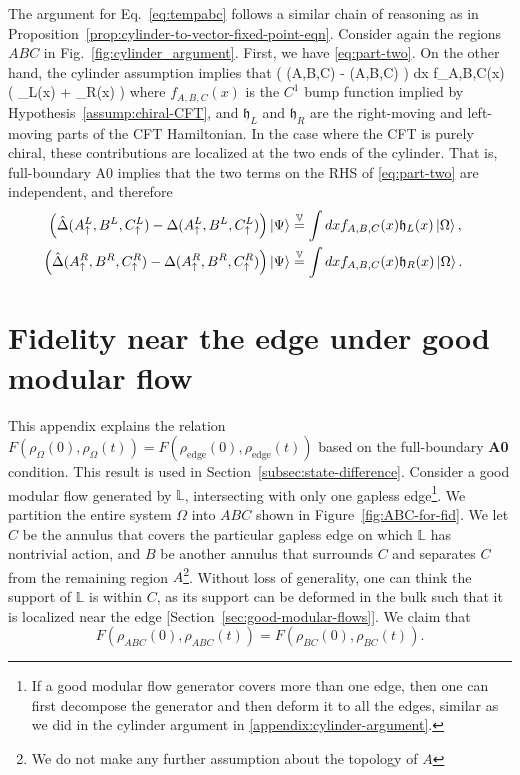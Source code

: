 \documentclass[12pt, nofootinbib]{article}
\theoremstyle{plain}
\theoremstyle{assumption}
\theoremstyle{definition}
\theoremstyle{plain}
\theoremstyle{plain}
\theoremstyle{plain}
\theoremstyle{plain}
\theoremstyle{plain}
\def\veq{\stackrel{\mathbb{V}}{=}}
\def\Lb{\mathbb{L}}
\def\({\left(}
\def\){\right)}
\def\hhh{{\mathfrak{h}}}
\begin{document}
The argument for Eq.~\eqref{eq:tempabc} follows a similar chain of reasoning as in Proposition~\ref{prop:cylinder-to-vector-fixed-point-eqn}. Consider again the regions $ABC$ in Fig.~\ref{fig:cylinder_argument}.  First, we have \eqref{eq:part-two}. On the other hand, the cylinder assumption implies that 
\be 
\( \hat \Delta(A,B,C) - \Delta(A,B,C) \) \ket\Psi 
\veq \int dx f_{A,B,C}(x) \( \hhh_L(x) + \hhh_R(x) \) \ket{\Omega} \ee
where $f_{A,B,C}(x)$ is the $C^1$ bump function implied by Hypothesis~\ref{assump:chiral-CFT}, and $\hhh_L$ and $\hhh_R$ are 
the right-moving and left-moving parts of the CFT Hamiltonian.  In the case where the CFT is purely chiral, these contributions are localized at the two ends of the cylinder.  
That is, full-boundary A0 implies that 
the two terms on the RHS of \eqref{eq:part-two} are independent, and therefore
\begin{align}
\( \hat \Delta(A_\up^L,B^L,C_\up^L) -\Delta(A_\up^L,B^L,C_\up^L) \)  \ket\Psi 
& \veq \int dx f_{A,B,C}(x)  \hhh_L(x)\ket\Omega , ~~~ \nonumber
\\ 
\(\hat \Delta(A_\up^R,B^R,C_\up^R) -\Delta(A_\up^R,B^R,C_\up^R) \)\ket\Psi 
& \veq \int dx f_{A,B,C}(x)  \hhh_R(x)\ket\Omega .
\end{align}



\section{Fidelity near the edge under good modular flow}
\label{app:fidelity}

This appendix explains the relation $F(\rho_{\Omega}(0),\rho_{\Omega}(t)) = F(\rho_{\text{edge}}(0), \rho_{\text{edge}}(t))$ based on the full-boundary {\bf A0} condition. This result is used in Section~\ref{subsec:state-difference}.
Consider a good modular flow generated by $\Lb$, intersecting with only one gapless edge\footnote{If a good modular flow generator covers more than one edge, then one can first decompose the generator and then deform it to all the edges, similar as we did in the cylinder argument in \ref{appendix:cylinder-argument}.}. We partition the entire system $\Omega$ into $ABC$ shown in Figure~\ref{fig:ABC-for-fid}. We let $C$ be the annulus that covers the particular gapless edge on which $\Lb$ has nontrivial action, and $B$ be another annulus that surrounds $C$ and separates $C$ from the remaining region $A$\footnote{We do not make any further assumption about the topology of $A$}. Without loss of generality, one can think the support of $\Lb$ is within $C$, as its support can be deformed in the bulk such that it is localized near the edge [Section~\ref{sec:good-modular-flows}]. We claim that 
\begin{equation}\label{eq:edge-Fid}
    F(\rho_{ABC}(0),\rho_{ABC}(t)) = F(\rho_{BC}(0),\rho_{BC}(t)).
\end{equation}
\end{document}

